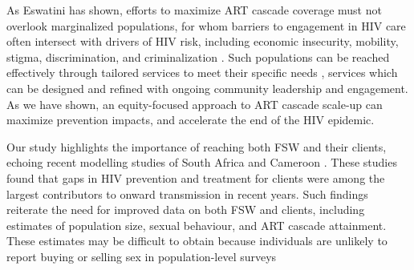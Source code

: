 \par
As Eswatini has shown,
efforts to maximize ART cascade coverage must not overlook marginalized populations,
for whom barriers to engagement in HIV care often intersect with drivers of HIV risk,
including economic insecurity, mobility, stigma, discrimination, and criminalization
\cite{Wanyenze2016,Schwartz2017,Schmidt-Sane2022,Camlin2019,Baral2019}.
Such populations can be reached effectively through
tailored services to meet their specific needs \cite{EswIBBS2022,Ehrenkranz2019},
services which can be designed and refined with ongoing community leadership and engagement.
As we have shown, an equity-focused approach to ART cascade scale-up
can maximize prevention impacts, and accelerate the end of the HIV epidemic.
\par
Our study highlights the importance of reaching both FSW and their clients,
echoing recent modelling studies of South Africa and Cameroon \cite{Stone2021,Silhol2024}.
These studies found that gaps in HIV prevention and treatment for clients
were among the largest contributors to onward transmission in recent years.
Such findings reiterate the need for improved data on both FSW and clients,
including estimates of population size, sexual behaviour, and ART cascade attainment.
These estimates may be difficult to obtain
because individuals are unlikely to report buying or selling sex in population-level surveys
